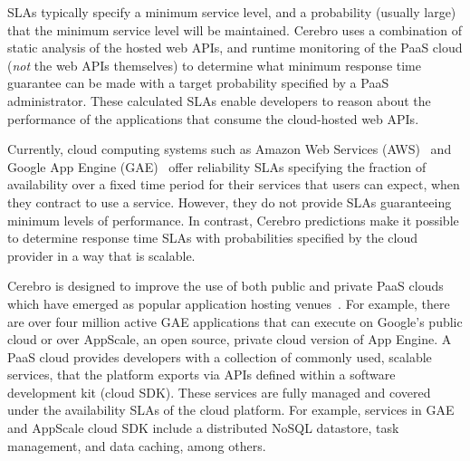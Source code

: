 SLAs typically specify a minimum service level, and a
probability (usually large) that the minimum service level will be
maintained. Cerebro uses a combination of static analysis of the hosted web APIs, 
and runtime monitoring of the PaaS cloud (\textit{not} the web APIs themselves) 
to determine what minimum response time guarantee can be made 
with a target probability specified by a PaaS administrator. These calculated
SLAs enable developers to
reason about the performance of the applications that consume the cloud-hosted
web APIs.

Currently, cloud computing systems such as Amazon Web Services
(AWS)~\cite{amazon-aws-web} and
Google App Engine (GAE)~\cite{gae} offer reliability SLAs specifying the fraction of
availability over a fixed time period for their services
that users can expect, when they contract to use a service. However, they do not provide SLAs
guaranteeing minimum levels of performance.
In contrast, Cerebro predictions make it possible to determine response time SLAs with
probabilities specified by the cloud provider in a way that is scalable.


Cerebro is designed to improve the use of both public and private PaaS clouds 
which have emerged as popular application
hosting venues~\cite{paas-growth}.
For example, there are over four million active GAE
applications that 
can execute on Google's public cloud or over AppScale, an open source, private 
cloud version of App Engine.
A PaaS cloud provides developers 
with a collection of commonly used, scalable services,
that the platform exports via APIs defined within a software 
development kit (cloud SDK). These services are fully managed and covered under 
the availability SLAs of the cloud platform. For example, services 
in GAE and AppScale cloud SDK
include a distributed NoSQL datastore, task management, 
and data caching, among others. 

